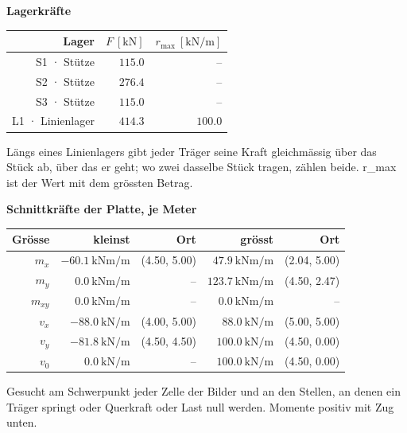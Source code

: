 \documentclass[11pt,a4paper]{article}
\begin{document}
\noindent\textbf{Lagerkräfte}
\begin{longtable}{rrr}
\hline
Lager & $F\ [\mathrm{kN}]$ & $r_{\max}\ [\mathrm{kN/m}]$ \\
\hline
\endhead
S1 · Stütze & $115.0$ & – \\
S2 · Stütze & $276.4$ & – \\
S3 · Stütze & $115.0$ & – \\
L1 · Linienlager & $414.3$ & $100.0$ \\
\hline
\end{longtable}
Längs eines Linienlagers gibt jeder Träger seine Kraft gleichmässig über das Stück ab, über das er geht; wo zwei dasselbe Stück tragen, zählen beide. r\_max ist der Wert mit dem grössten Betrag.

\noindent\textbf{Schnittkräfte der Platte, je Meter}
\begin{longtable}{rrrrr}
\hline
Grösse & kleinst & Ort & grösst & Ort \\
\hline
\endhead
$m_x$ & $-60.1\ \mathrm{kNm/m}$ & (4.50, 5.00) & $47.9\ \mathrm{kNm/m}$ & (2.04, 5.00) \\
$m_y$ & $0.0\ \mathrm{kNm/m}$ & – & $123.7\ \mathrm{kNm/m}$ & (4.50, 2.47) \\
$m_{xy}$ & $0.0\ \mathrm{kNm/m}$ & – & $0.0\ \mathrm{kNm/m}$ & – \\
$v_x$ & $-88.0\ \mathrm{kN/m}$ & (4.00, 5.00) & $88.0\ \mathrm{kN/m}$ & (5.00, 5.00) \\
$v_y$ & $-81.8\ \mathrm{kN/m}$ & (4.50, 4.50) & $100.0\ \mathrm{kN/m}$ & (4.50, 0.00) \\
$v_0$ & $0.0\ \mathrm{kN/m}$ & – & $100.0\ \mathrm{kN/m}$ & (4.50, 0.00) \\
\hline
\end{longtable}
Gesucht am Schwerpunkt jeder Zelle der Bilder und an den Stellen, an denen ein Träger springt oder Querkraft oder Last null werden. Momente positiv mit Zug unten.
\end{document}
